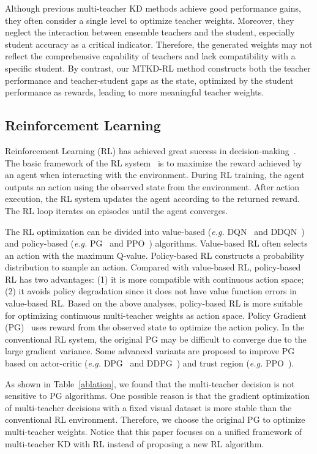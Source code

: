 	Although previous multi-teacher KD methods achieve good performance gains, they often consider a single level to optimize teacher weights.  Moreover, they neglect the interaction between ensemble teachers and the student, especially student accuracy as a critical indicator. Therefore, the generated weights may not reflect the comprehensive capability of teachers and lack compatibility with a specific student. By contrast, our MTKD-RL method  constructs both the teacher performance and teacher-student gaps as the state, optimized by the student performance as rewards, leading to more meaningful teacher weights.
	
	
	\subsection{Reinforcement Learning}
	Reinforcement Learning (RL) has achieved great success in decision-making~\cite{kaelbling1996reinforcement,liu2020new,chengqing2023multi}. The basic framework of the RL system~\cite{mnih2013playing,van2016deep} is to maximize the reward achieved by an agent when interacting with the environment. During RL training, the agent outputs an action using the observed state from the environment.  After action execution, the RL system updates the agent according to the returned reward. The RL loop iterates on episodes until the agent converges.
	
	The RL optimization can be divided into value-based (\emph{e.g. }DQN~\cite{mnih2013playing} and DDQN~\cite{van2016deep}) and policy-based (\emph{e.g. } PG~\cite{sutton1999policy} and PPO~\cite{schulman2017proximal}) algorithms. Value-based RL often selects an action with the maximum Q-value.  Policy-based RL constructs a probability distribution to sample an action. Compared with value-based RL, policy-based RL has two advantages: (1) it is more compatible with continuous action space; (2) it avoids policy degradation since it does not have value function errors in value-based RL. Based on the above analyses, policy-based RL is more suitable for optimizing continuous multi-teacher weights as action space. Policy Gradient (PG)~\cite{sutton1999policy} uses reward from the observed state to optimize the action policy. In the conventional RL system, the original PG may be difficult to converge due to the large gradient variance. Some advanced variants are proposed to improve PG based on actor-critic (\emph{e.g. }DPG~\cite{silver2014deterministic} and DDPG~\cite{lillicrap2015continuous}) and trust region (\emph{e.g. }PPO~\cite{schulman2017proximal}). 
	
	As shown in Table~\ref{ablation}, we found that the multi-teacher decision is not sensitive to PG algorithms. One possible reason is that the gradient optimization of multi-teacher decisions with a fixed visual dataset is more stable than the conventional RL environment. Therefore, we choose the original PG to optimize multi-teacher weights. Notice that this paper focuses on a unified framework of multi-teacher KD with RL instead of proposing a new RL algorithm.